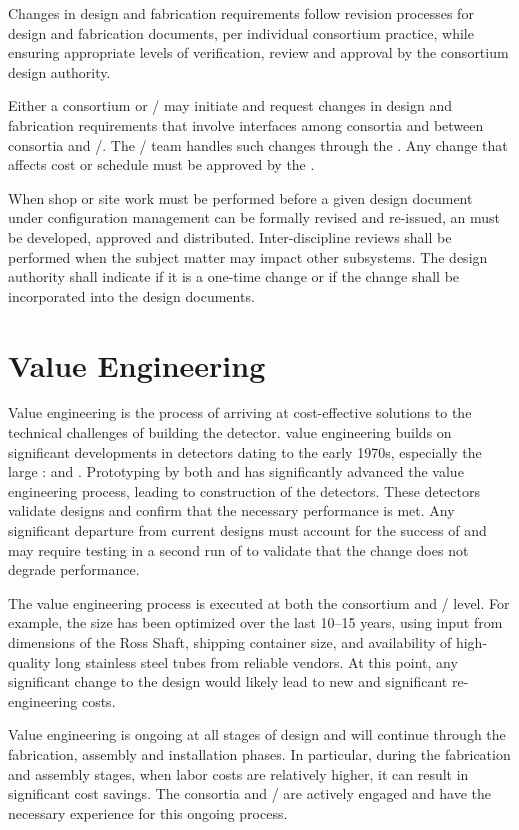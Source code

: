 Changes in design and fabrication requirements follow revision
processes for design and fabrication documents, per individual
consortium practice, while ensuring appropriate levels of
verification, review and approval by the consortium design authority.

Either a consortium or / may initiate and request
changes in design and fabrication requirements that involve interfaces
among consortia and between consortia and /.  The
/ team handles such changes through the
. Any change that affects cost or schedule must be approved
by the .

When shop or site work must be performed before a given 
design
document under configuration management can be formally revised and re-issued, 
an  must be developed, approved and distributed. 
Inter-discipline reviews shall be
performed when the  subject matter may impact other
subsystems. The design authority shall indicate if it is a one-time
change or if the change shall be incorporated into the design
documents. 



\section{Value Engineering}
\label{sec:fdsp-coord-ve}

Value engineering is the process of arriving at cost-effective
solutions to the technical challenges of building the 
detector.  value engineering builds on significant
developments in  detectors dating to the early 1970s,
especially the large :  and
. Prototyping by both  and  has
significantly advanced the value engineering process, leading to
construction of the  detectors. These detectors validate
 designs and confirm that the necessary performance is
met. Any significant departure from current designs must account for
the success of   and may require testing in a second
run of  to validate that the change does not degrade performance. 

The value engineering process is executed at both the consortium and
/ level. For example, the  size has been optimized
over the last 10--15 years, using input from dimensions of the Ross
Shaft, shipping container size, and availability of high-quality long
stainless steel tubes from reliable vendors.  At this point, any
significant change to the  design would likely lead to new
and significant re-engineering costs.

Value engineering is ongoing at all stages of design and will continue
through the fabrication, assembly and installation phases. In
particular, during the fabrication and assembly stages, when labor costs
are relatively higher, it can result in significant cost savings. The
consortia and / are actively engaged and have the necessary
experience for this ongoing process.
